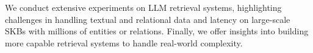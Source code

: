 \vspace{-5pt}
We conduct extensive experiments on LLM retrieval systems, highlighting challenges in handling textual and relational data and latency on large-scale SKBs with millions of entities or relations. Finally, we offer insights into building more capable retrieval systems to handle real-world complexity.









